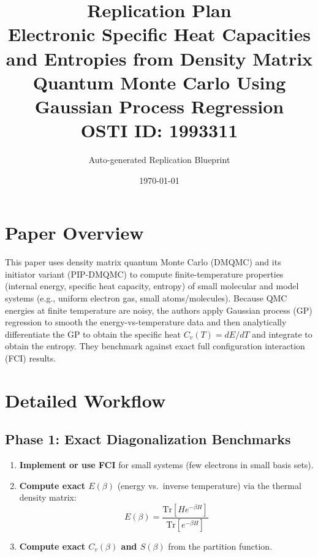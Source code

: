 \documentclass[11pt,a4paper]{article}
\title{\textbf{Replication Plan}\\[0.5em]
\large Electronic Specific Heat Capacities and Entropies from Density Matrix Quantum Monte Carlo Using Gaussian Process Regression\\[0.3em]
\normalsize OSTI ID: 1993311}
\author{Auto-generated Replication Blueprint}
\date{\today}
\begin{document}
\maketitle
\tableofcontents
\newpage

\section{Paper Overview}
This paper uses density matrix quantum Monte Carlo (DMQMC) and its initiator variant (PIP-DMQMC) to compute finite-temperature properties (internal energy, specific heat capacity, entropy) of small molecular and model systems (e.g., uniform electron gas, small atoms/molecules). Because QMC energies at finite temperature are noisy, the authors apply Gaussian process (GP) regression to smooth the energy-vs-temperature data and then analytically differentiate the GP to obtain the specific heat $C_v(T) = dE/dT$ and integrate to obtain the entropy. They benchmark against exact full configuration interaction (FCI) results.

\section{Detailed Workflow}

\subsection{Phase 1: Exact Diagonalization Benchmarks}
\begin{enumerate}[label=\textbf{1.\arabic*}]
  \item \textbf{Implement or use FCI} for small systems (few electrons in small basis sets).
  \item \textbf{Compute exact $E(\beta)$} (energy vs.\ inverse temperature) via the thermal density matrix:
    \begin{equation*}
      E(\beta) = \frac{\text{Tr}[H e^{-\beta H}]}{\text{Tr}[e^{-\beta H}]}
    \end{equation*}
  \item \textbf{Compute exact $C_v(\beta)$ and $S(\beta)$} from the partition function.
\end{enumerate}
\end{document}

